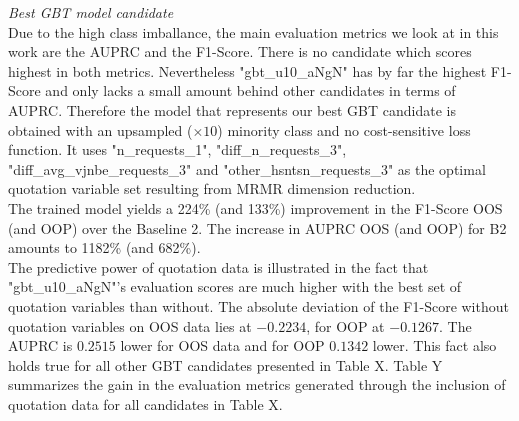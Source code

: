 \documentclass[12pt,titlepage]{article}
\begin{document}
\textit{Best GBT model candidate} \\
Due to the high class imballance, the main evaluation metrics we look at in this work are the AUPRC and the F1-Score. There is no candidate which scores highest in both metrics. Nevertheless "gbt\_u10\_aNgN" has by far the highest F1-Score and only lacks a small amount behind other candidates in terms of AUPRC. Therefore the model that represents our best GBT candidate is obtained with an upsampled ($\times 10$) minority class and no cost-sensitive loss function. It uses "n\_requests\_1", "diff\_n\_requests\_3", "diff\_avg\_vjnbe\_requests\_3" and "other\_hsntsn\_requests\_3" as the optimal quotation variable set resulting from MRMR dimension reduction. \\
The trained model yields a 224\% (and 133\%) improvement in the F1-Score OOS (and OOP) over the Baseline 2. The increase in AUPRC OOS (and OOP) for B2 amounts to 1182\% (and 682\%). \\
The predictive power of quotation data is illustrated in the fact that "gbt\_u10\_aNgN"'s evaluation scores are much higher with the best set of quotation variables than without. The absolute deviation of the F1-Score without quotation variables on OOS data lies at $-0.2234$, for OOP at $-0.1267$. The AUPRC is $0.2515$ lower for OOS data and for OOP $0.1342$ lower. This fact also holds true for all other GBT candidates presented in Table X. Table Y summarizes the gain in the evaluation metrics generated through the inclusion of quotation data for all candidates in Table X. \\
\end{document}
